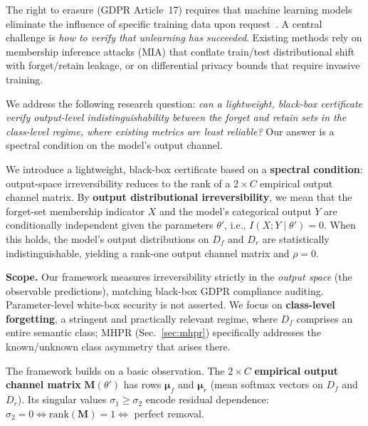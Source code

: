 \documentclass[smallextended]{svjour3}       %
\begin{document}
The right to erasure (GDPR Article~17) requires that machine learning models eliminate the influence of specific training data upon request~\cite{bourtoule2021machine,nguyen2025survey}. A central challenge is \emph{how to verify that unlearning has succeeded}. Existing methods rely on membership inference attacks (MIA) that conflate train/test distributional shift with forget/retain leakage, or on differential privacy bounds that require invasive training.

We address the following research question: \emph{can a lightweight, black-box certificate verify output-level indistinguishability between the forget and retain sets in the class-level regime, where existing metrics are least reliable?} Our answer is a spectral condition on the model's output channel.

We introduce a lightweight, black-box certificate based on a \textbf{spectral condition}: output-space irreversibility reduces to the rank of a $2\times C$ empirical output channel matrix. By \textbf{output distributional irreversibility}, we mean that the forget-set membership indicator $X$ and the model's categorical output $Y$ are conditionally independent given the parameters $\theta'$, i.e., $I(X;Y\mid\theta')=0$. When this holds, the model's output distributions on $D_f$ and $D_r$ are statistically indistinguishable, yielding a rank-one output channel matrix and $\rho=0$.

\textbf{Scope.} Our framework measures irreversibility strictly in the \emph{output space} (the observable predictions), matching black-box GDPR compliance auditing. Parameter-level white-box security is not asserted. We focus on \textbf{class-level forgetting}, a stringent and practically relevant regime, where $D_f$ comprises an entire semantic class; MHPR (Sec.~\ref{sec:mhpr}) specifically addresses the known/unknown class asymmetry that arises there.

The framework builds on a basic observation. The $2\times C$ \textbf{empirical output channel matrix} $\mathbf{M}(\theta')$ has rows $\boldsymbol{\mu}_f$ and $\boldsymbol{\mu}_r$ (mean softmax vectors on $D_f$ and $D_r$). Its singular values $\sigma_1 \ge \sigma_2$ encode residual dependence: $\sigma_2 = 0 \iff \mathrm{rank}(\mathbf{M}) = 1 \iff$ perfect removal.
\end{document}
